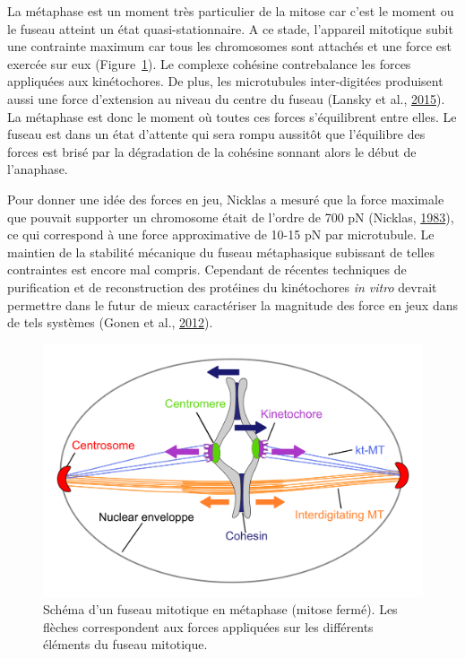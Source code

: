 \documentclass[12pt,a4paper,twoside,openright]{book}
\begin{document}
La métaphase est un moment très particulier de la mitose car c'est le
moment ou le fuseau atteint un état quasi-stationnaire. A ce stade,
l'appareil mitotique subit une contrainte maximum car tous les
chromosomes sont attachés et une force est exercée sur eux
(Figure~\ref{fig:spindle}). Le complexe cohésine contrebalance les
forces appliquées aux kinétochores. De plus, les microtubules
inter-digitées produisent aussi une force d'extension au niveau du
centre du fuseau (Lansky et al.,
\protect\hyperlink{ref-Lansky2015}{2015}). La métaphase est donc le
moment où toutes ces forces s'équilibrent entre elles. Le fuseau est
dans un état d'attente qui sera rompu aussitôt que l'équilibre des
forces est brisé par la dégradation de la cohésine sonnant alors le
début de l'anaphase.

Pour donner une idée des forces en jeu, Nicklas a mesuré que la force
maximale que pouvait supporter un chromosome était de l'ordre de 700 pN
(Nicklas, \protect\hyperlink{ref-Nicklas1983}{1983}), ce qui correspond
à une force approximative de 10-15 pN par microtubule. Le maintien de la
stabilité mécanique du fuseau métaphasique subissant de telles
contraintes est encore mal compris. Cependant de récentes techniques de
purification et de reconstruction des protéines du kinétochores \emph{in
vitro} devrait permettre dans le futur de mieux caractériser la
magnitude des force en jeux dans de tels systèmes (Gonen et al.,
\protect\hyperlink{ref-Gonen2012a}{2012}).

\begin{figure}[htbp]
\centering
\includegraphics{figures/intro/spindle.png}
\caption[Schéma d'un fuseau mitotique en métaphase]{\label{fig:spindle}Schéma
d'un fuseau mitotique en métaphase (mitose fermé). Les flèches
correspondent aux forces appliquées sur les différents éléments du
fuseau mitotique.}
\end{figure}
\end{document}
